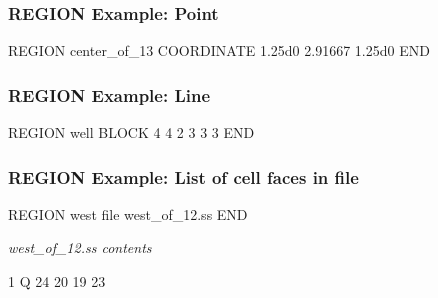 \begin{frame}[fragile]\frametitle{REGION Example: Point}

\begin{semiverbatim}
REGION center_of_13
  COORDINATE 1.25d0 2.91667 1.25d0
END
\end{semiverbatim}

\end{frame}

\begin{frame}[fragile]\frametitle{REGION Example: Line}

\begin{semiverbatim}
REGION well
  BLOCK 4 4 2 3 3 3
END
\end{semiverbatim}

\end{frame}

\begin{frame}[fragile]\frametitle{REGION Example: List of cell faces in file}

\begin{semiverbatim}
REGION west
  file west_of_12.ss
END
\end{semiverbatim}

\textit{west\_of\_12.ss contents}
\begin{semiverbatim}
1
Q 24 20 19 23
\end{semiverbatim}

\end{frame}


